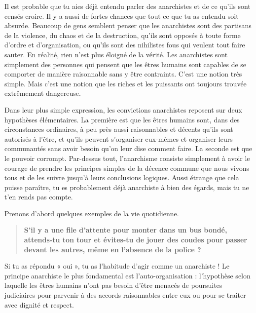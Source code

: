Il est probable que tu aies déjà entendu parler des anarchistes et de ce qu'ils sont censés croire. Il y a aussi de fortes chances que tout ce que tu as entendu soit absurde. Beaucoup de gens semblent penser que les anarchistes sont des partisans de la violence, du chaos et de la destruction, qu'ils sont opposés à toute forme d'ordre et d'organisation, ou qu'ils sont des nihilistes fous qui veulent tout faire sauter. En réalité, rien n'est plus éloigné de la vérité. Les anarchistes sont simplement des personnes qui pensent que les êtres humains sont capables de se comporter de manière raisonnable sans y être contraints. C'est une notion très simple. Mais c'est une notion que les riches et les puissants ont toujours trouvée extrêmement dangereuse.

Dans leur plus simple expression, les convictions anarchistes reposent sur deux hypothèses élémentaires. La première est que les êtres humains sont, dans des circonstances ordinaires, à peu près aussi raisonnables et décents qu'ils sont autorisés à l'être, et qu'ils peuvent s'organiser eux-mêmes et organiser leurs communautés sans avoir besoin qu'on leur dise comment faire. La seconde est que le pouvoir corrompt. Par-dessus tout, l'anarchisme consiste simplement à avoir le courage de prendre les principes simples de la décence commune que nous vivons tous et de les suivre jusqu'à leurs conclusions logiques. Aussi étrange que cela puisse paraître, tu es probablement déjà anarchiste à bien des égards, mais tu ne t'en rends pas compte.

Prenons d'abord quelques exemples de la vie quotidienne.

\begin{quotation}
\textbf{S'il y a une file d'attente pour monter dans un bus bondé, attends-tu ton tour et évites-tu de jouer des coudes pour passer devant les autres, même en l'absence de la police ?}
\end{quotation}

Si tu as répondu « oui », tu as l'habitude d'agir comme un anarchiste ! Le principe anarchiste le plus fondamental est l'auto-organisation : l'hypothèse selon laquelle les êtres humains n'ont pas besoin d'être menacés de poursuites judiciaires pour parvenir à des accords raisonnables entre eux ou pour se traiter avec dignité et respect.


